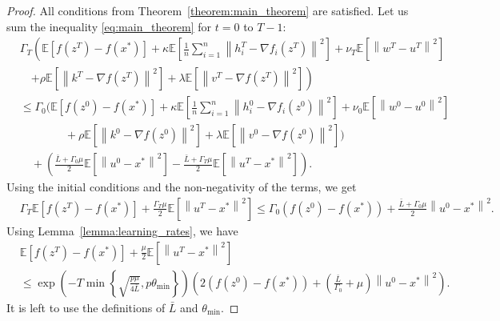 \documentclass{article} %
\newcommand{\norm}[1]{\left\| #1 \right\|}
\newcommand{\Exp}[1]{{\mathbb{E}}\left[#1\right]}
\theoremstyle{plain}
\theoremstyle{definition}
\theoremstyle{remark}
\begin{document}
\begin{proof}
All conditions from Theorem~\ref{theorem:main_theorem} are satisfied. Let us sum the inequality \eqref{eq:main_theorem} for $t = 0$ to $T - 1:$
\begin{align*}
  &\Gamma_{T}\left(\Exp{f(z^{T}) - f(x^*)} + \kappa \Exp{\frac{1}{n}\sum_{i=1}^n \norm{h_i^{T} - \nabla f_i(z^{T})}^2} + \nu_{T} \Exp{\norm{w^{T} - u^{T}}^2}\right.\\
    &\quad  \left.+ \rho \Exp{\norm{k^{T} - \nabla f(z^{T})}^2} + \lambda \Exp{\norm{v^{T} - \nabla f(z^{T})}^2}\right)\\
    &\leq \Gamma_{0} \Bigg( \Exp{f(z^{0}) - f(x^*)} + \kappa \Exp{\frac{1}{n}\sum_{i=1}^n \norm{h_i^0 - \nabla f_i(z^{0})}^2}  + \nu_{0} \Exp{\norm{w^0 - u^0}^2} \\
    &\qquad\qquad + \rho \Exp{\norm{k^{0} - \nabla f(z^0)}^2} + \lambda \Exp{\norm{v^{0} - \nabla f(z^0)}^2} \Bigg)\\
    &\quad+ \left(\frac{\bar{L} + \Gamma_{0} \mu}{2} \Exp{\norm{u^0 - x^*}^2} - \frac{\bar{L} + \Gamma_{T} \mu}{2} \Exp{\norm{u^{T} - x^*}^2}\right).
\end{align*}
Using the initial conditions and the non-negativity of the terms, we get
\begin{align*}
  &\Gamma_{T}\Exp{f(z^{T}) - f(x^*)} + \frac{\Gamma_{T} \mu}{2} \Exp{\norm{u^{T} - x^*}^2} \leq \Gamma_{0} \left(f(z^{0}) - f(x^*)\right) + \frac{\bar{L} + \Gamma_{0} \mu}{2} \norm{u^0 - x^*}^2.
\end{align*}
Using Lemma~\ref{lemma:learning_rates}, we have
\begin{align*}
  &\Exp{f(z^{T}) - f(x^*)} + \frac{\mu}{2} \Exp{\norm{u^{T} - x^*}^2} \\
  &\leq \exp\left(-T \min\left\{\sqrt{\frac{p \mu}{4 \bar{L}}}, p\theta_{\min}\right\}\right)\left(2 \left(f(z^{0}) - f(x^*)\right) + \left(\frac{\bar{L}}{\Gamma_{0}} + \mu\right) \norm{u^0 - x^*}^2\right).
\end{align*}
It is left to use the definitions of $\bar{L}$ and $\theta_{\min}.$
\end{proof}
\end{document}
